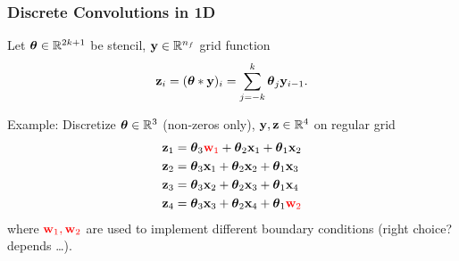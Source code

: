 \documentclass[12pt,fleqn,handout]{beamer}
\begin{document}
\begin{frame}\frametitle{Discrete Convolutions in 1D}
	Let ${\boldsymbol \theta} \in\mathbb{R}^{2k+1}$ be stencil, ${\bf y} \in \mathbb{R}^{n_f}$ grid function
\begin{equation*}
		{\bf z}_i = ({\boldsymbol \theta} * {\bf y})_i = \sum_{j=-k}^k {\boldsymbol \theta}_{j} {\bf y}_{i-1}.
	\end{equation*}
	
	\bigskip
	\pause

	 Example: Discretize ${\boldsymbol \theta} \in \mathbb{R}^3$ (non-zeros only), ${\bf y},{\bf z} \in \mathbb{R}^4$ on regular grid
	 \begin{align*}
	 	{\bf z}_1 & = {\boldsymbol \theta}_3 \textcolor{red}{{\bf w}_1} + {\boldsymbol \theta}_2 {\bf x}_1 + {\boldsymbol \theta}_1 {\bf x}_2 \\
	 	{\bf z}_2 & = {\boldsymbol \theta}_3 {\bf x}_1 + {\boldsymbol \theta}_2 {\bf x}_2 + {\boldsymbol \theta}_1 {\bf x}_3 \\
	 	{\bf z}_3 & = {\boldsymbol \theta}_3 {\bf x}_2 + {\boldsymbol \theta}_2 {\bf x}_3 + {\boldsymbol \theta}_1 {\bf x}_4 \\
	 	{\bf z}_4 & = {\boldsymbol \theta}_3 {\bf x}_3 + {\boldsymbol \theta}_2 {\bf x}_4 + {\boldsymbol \theta}_1 \textcolor{red}{{\bf w}_2}
	 \end{align*}
	 where $\textcolor{red}{{\bf w}_1, {\bf w}_2}$ are used to implement different boundary conditions (right choice? depends \ldots).
\end{frame}
\end{document}
